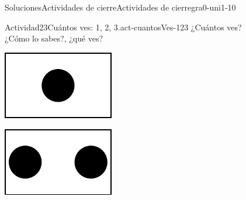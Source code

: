 \documentclass[twoside,10pt,]{article}
\begin{document}
\begin{solutions-section}{Soluciones}{Actividades de cierre}{}{Actividades de cierre}{}{}{gra0-uni1-10}
\begin{activitysolution}{Actividad}{23}{Cuántos ves: 1, 2, 3.}{act-cuantosVes-123}
¿Cuántos ves?\\
 ¿Cómo lo sabes?, ¿qué ves?%
\begin{sidebyside}{3}{0.0416666666666667}{0.0416666666666667}{0.0833333333333333}%
\begin{sbspanel}{0.25}%
\includegraphics[width=\linewidth]{external/svg-source/tikz-file-136322.pdf}
\end{sbspanel}%
\begin{sbspanel}{0.25}%
\includegraphics[width=\linewidth]{external/svg-source/tikz-file-136323.pdf}
\end{sbspanel}%
\begin{sbspanel}{0.25}%

\end{sbspanel}
\end{sidebyside}
\end{activitysolution}
\end{solutions-section}
\end{document}

